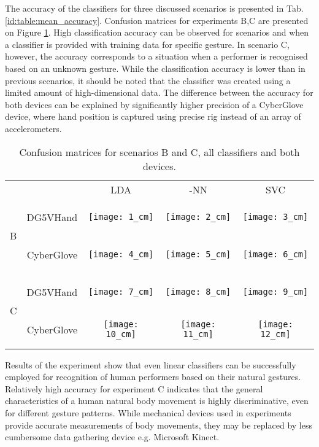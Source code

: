 \documentclass[]{article}
\begin{document}
The accuracy of the classifiers for three discussed scenarios is presented in
Tab. \ref{id:table:mean_accuracy}. Confusion matrices for experiments B,C are
presented  on Figure \ref{fig:confusion_matrices}. High classification accuracy
can be observed for scenarios  and  when a classifier is provided with
training data for specific gesture. In scenario C, however, the accuracy
corresponds to a situation when a performer is recognised based on an unknown 
gesture. While the classification accuracy is lower than in previous scenarios,
it should be noted that the classifier was created using a limited amount of
high-dimensional data. The difference between the accuracy for both devices can
be explained by significantly higher precision of a CyberGlove device, where
hand position is captured using precise rig instead of an array of
accelerometers. 

\begin{table}[ht]
\centering
\begin{tabular}{c| c c c c}
& & LDA & -NN & SVC\\ \multirow{2}{*}{B}
&{\begin{sideways}\parbox{5cm}{\centering DG5VHand}\end{sideways}}
&\texttt{[image: 1\_cm]}
&\texttt{[image: 2\_cm]}
&\texttt{[image: 3\_cm]}\\ 
&{\begin{sideways}\parbox{5cm}{\centering CyberGlove}\end{sideways}}
&\texttt{[image: 4\_cm]}
&\texttt{[image: 5\_cm]}
&\texttt{[image: 6\_cm]}\\ 
\hline 
\multirow{2}{*}{C}
&{\begin{sideways}\parbox{5cm}{\centering DG5VHand}\end{sideways}}
&\texttt{[image: 7\_cm]}
&\texttt{[image: 8\_cm]}
&\texttt{[image: 9\_cm]}\\ 
&{\begin{sideways}\parbox{5cm}{\centering CyberGlove}\end{sideways}}
&\texttt{[image: 10\_cm]}
&\texttt{[image: 11\_cm]}
&\texttt{[image: 12\_cm]} 
\end{tabular}
\caption{Confusion matrices for scenarios B and C, all classifiers and both devices.}
\label{fig:confusion_matrices}
\end{table} 

Results of the experiment show that even linear classifiers can be successfully
employed for recognition of human performers based on their natural gestures.
Relatively high accuracy for experiment C indicates that the general
characteristics of a human natural body movement is highly discriminative, even
for different gesture patterns. While mechanical devices used in experiments
provide accurate measurements of body movements, they may be replaced by less
cumbersome data gathering device e.g. Microsoft Kinect\texttrademark. 
\end{document}

